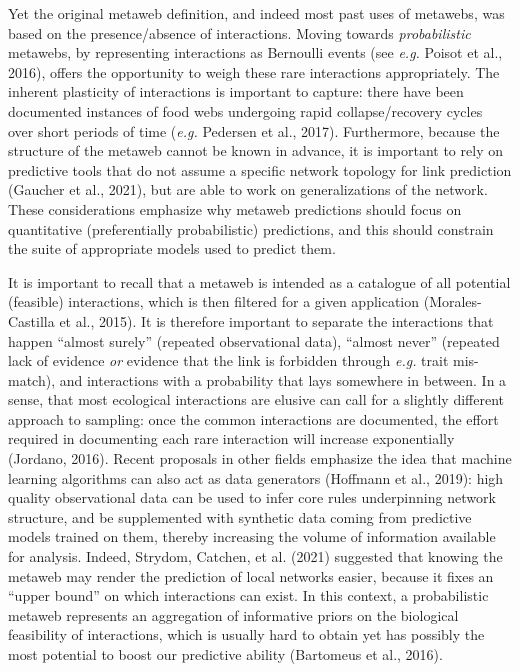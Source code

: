 \documentclass[10pt,oneside]{article}
\begin{document}
Yet the original metaweb definition, and indeed most past uses of
metawebs, was based on the presence/absence of interactions. Moving
towards \emph{probabilistic} metawebs, by representing interactions as
Bernoulli events (see \emph{e.g.} Poisot et al., 2016), offers the
opportunity to weigh these rare interactions appropriately. The inherent
plasticity of interactions is important to capture: there have been
documented instances of food webs undergoing rapid collapse/recovery
cycles over short periods of time (\emph{e.g.} Pedersen et al., 2017).
Furthermore, because the structure of the metaweb cannot be known in
advance, it is important to rely on predictive tools that do not assume
a specific network topology for link prediction (Gaucher et al., 2021),
but are able to work on generalizations of the network. These
considerations emphasize why metaweb predictions should focus on
quantitative (preferentially probabilistic) predictions, and this should
constrain the suite of appropriate models used to predict them.

It is important to recall that a metaweb is intended as a catalogue of
all potential (feasible) interactions, which is then filtered for a
given application (Morales-Castilla et al., 2015). It is therefore
important to separate the interactions that happen ``almost surely''
(repeated observational data), ``almost never'' (repeated lack of
evidence \emph{or} evidence that the link is forbidden through
\emph{e.g.} trait mis-match), and interactions with a probability that
lays somewhere in between. In a sense, that most ecological interactions
are elusive can call for a slightly different approach to sampling: once
the common interactions are documented, the effort required in
documenting each rare interaction will increase exponentially (Jordano,
2016). Recent proposals in other fields emphasize the idea that machine
learning algorithms can also act as data generators (Hoffmann et al.,
2019): high quality observational data can be used to infer core rules
underpinning network structure, and be supplemented with synthetic data
coming from predictive models trained on them, thereby increasing the
volume of information available for analysis. Indeed, Strydom, Catchen,
et al. (2021) suggested that knowing the metaweb may render the
prediction of local networks easier, because it fixes an ``upper bound''
on which interactions can exist. In this context, a probabilistic
metaweb represents an aggregation of informative priors on the
biological feasibility of interactions, which is usually hard to obtain
yet has possibly the most potential to boost our predictive ability
(Bartomeus et al., 2016).
\end{document}
